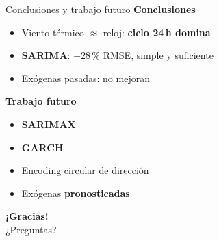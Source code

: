\documentclass[12pt,aspectratio=169,t]{beamer}
\begin{document}
\begin{frame}{Conclusiones y trabajo futuro}
  \textbf{Conclusiones}
  \begin{itemize}\itemsep2pt
    \item Viento térmico $\approx$ reloj: \textbf{ciclo 24\,h domina}
    \item \textbf{SARIMA}: $-28\,\%$ RMSE, simple y suficiente
    \item Exógenas pasadas: no mejoran
  \end{itemize}
  \vspace{0.6em}
  \textbf{Trabajo futuro}
  \begin{itemize}\itemsep2pt
    \item \textbf{SARIMAX}
    \item \textbf{GARCH}
    \item Encoding circular de dirección
    \item Exógenas \textbf{pronosticadas}
  \end{itemize}
\end{frame}

\begin{frame}[plain,c]
  \centering
  {\Huge \textbf{¡Gracias!}}\\[1em]
  {\Large ¿Preguntas?}
\end{frame}
\end{document}
